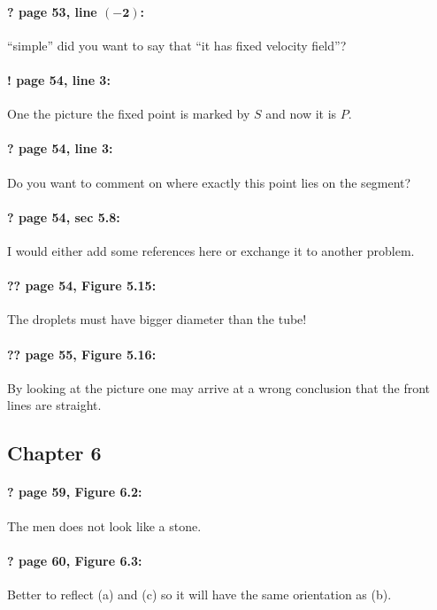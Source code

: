 \documentclass[twoside]{article}
\begin{document}
\paragraph{? page 53, line $\bm{(-2)}$:} ``simple'' did you want to say that ``it has fixed velocity field''?

\paragraph{! page 54, line 3:} One the picture the fixed point is marked by $S$ and now it is $P$.

\paragraph{? page 54, line 3:} Do you want to comment on where exactly this point lies on the segment?

\paragraph{? page 54, sec 5.8:} I would either add some references here or exchange it to another problem.

\paragraph{?? page 54, Figure 5.15:} The droplets must have bigger diameter than the tube!

\paragraph{?? page 55, Figure 5.16:} By looking at the picture one may arrive at a wrong conclusion that the front lines are straight.

\subsection*{Chapter 6}

\paragraph{? page 59, Figure 6.2:} The men does not look like a stone.

\paragraph{? page 60, Figure 6.3:} Better to reflect (a) and (c) so it will have the same orientation as (b).
\end{document}
